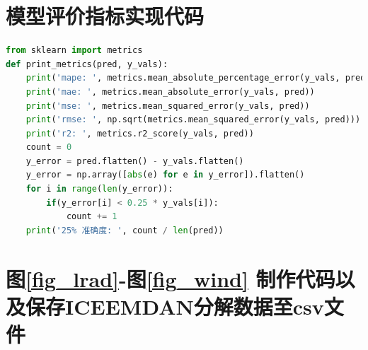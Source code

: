 \documentclass[AutoFakeBold]{LZUThesis}
\begin{document}
\section{模型评价指标实现代码}

\begin{lstlisting}[language = python]
from sklearn import metrics
def print_metrics(pred, y_vals):
    print('mape: ', metrics.mean_absolute_percentage_error(y_vals, pred))
    print('mae: ', metrics.mean_absolute_error(y_vals, pred))
    print('mse: ', metrics.mean_squared_error(y_vals, pred))
    print('rmse: ', np.sqrt(metrics.mean_squared_error(y_vals, pred)))
    print('r2: ', metrics.r2_score(y_vals, pred))
    count = 0
    y_error = pred.flatten() - y_vals.flatten()
    y_error = np.array([abs(e) for e in y_error]).flatten()
    for i in range(len(y_error)):
        if(y_error[i] < 0.25 * y_vals[i]):
            count += 1
    print('25% 准确度: ', count / len(pred))
\end{lstlisting}

\section{图\ref{fig_lrad}-图\ref{fig_wind} 制作代码以及保存ICEEMDAN分解数据至csv文件}
\end{document}
